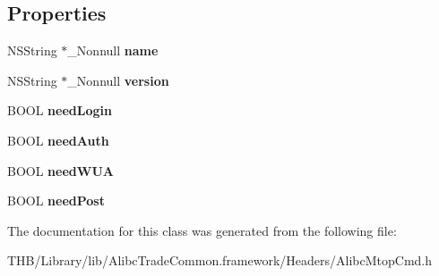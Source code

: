 \subsection*{Properties}
\begin{DoxyCompactItemize}
\item 
\mbox{\label{interface_alibc_mtop_cmd_a1a5d1c6849d8df85e49249ee6febb473}} 
N\+S\+String $\ast$\+\_\+\+Nonnull {\bfseries name}
\item 
\mbox{\label{interface_alibc_mtop_cmd_a88a9af64d607fb99ea3b00c2ad77447a}} 
N\+S\+String $\ast$\+\_\+\+Nonnull {\bfseries version}
\item 
\mbox{\label{interface_alibc_mtop_cmd_a9335e4130702cc155d52f23d43dd3fed}} 
B\+O\+OL {\bfseries need\+Login}
\item 
\mbox{\label{interface_alibc_mtop_cmd_afab92a931b58caacc8fa50e6bdbf6482}} 
B\+O\+OL {\bfseries need\+Auth}
\item 
\mbox{\label{interface_alibc_mtop_cmd_ad947d8c25eaa3d04e90c3f4c3a57a602}} 
B\+O\+OL {\bfseries need\+W\+UA}
\item 
\mbox{\label{interface_alibc_mtop_cmd_a76c2cf297ae0f7984b19fb93674fd0aa}} 
B\+O\+OL {\bfseries need\+Post}
\end{DoxyCompactItemize}


The documentation for this class was generated from the following file\+:\begin{DoxyCompactItemize}
\item 
T\+H\+B/\+Library/lib/\+Alibc\+Trade\+Common.\+framework/\+Headers/Alibc\+Mtop\+Cmd.\+h\end{DoxyCompactItemize}
